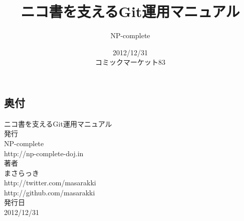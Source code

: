 \documentclass{jarticle}
\title{ニコ書を支えるGit運用マニュアル}
\author{NP-complete}
\date{2012/12/31\\コミックマーケット83}
\begin{document}
\Huge
\maketitle
\normalsize
\thispagestyle{empty}
\newpage
\thispagestyle{empty}
\-
\newpage


\newpage


\newpage





\newpage

\newpage



\newpage

\newpage

\begin{center}
  \Large
  \section*{奥付}
           {\huge ニコ書を支えるGit運用マニュアル}
           \\[2.0cm]
           発行\\
           NP-complete\\
           http://np-complete-doj.in
           \\[1.5cm]
           著者\\
           まさらっき\\
           http://twitter.com/masarakki\\
           http://github.com/masarakki
           \\[2.5cm]
           発行日\\
           2012/12/31
\end{center}
\newpage
\thispagestyle{empty}
\-
\newpage
\begin{flushright}
  \-
\end{flushright}

\thispagestyle{empty}
\end{document}
